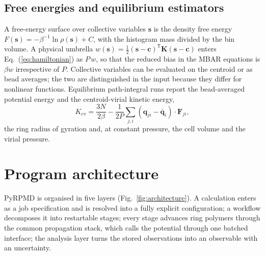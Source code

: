 \documentclass[preprint,12pt]{elsarticle}
\begin{document}
\subsection{Free energies and equilibrium estimators}

A free-energy surface over collective variables $\mathbf s$ is the density free energy $F(\mathbf s)=-\beta^{-1}\ln\rho(\mathbf s)+C$, with the histogram mass divided by the bin volume. A physical umbrella $w(\mathbf s)=\frac12(\mathbf s-\mathbf c)^{\mathsf T}\mathbf K(\mathbf s-\mathbf c)$ enters Eq.~(\ref{eq:hamiltonian}) as $P\,w$, so that the reduced bias in the MBAR equations \cite{samp-mbar2008} is $\beta w$ irrespective of $P$. Collective variables can be evaluated on the centroid or as bead averages; the two are distinguished in the input because they differ for nonlinear functions. Equilibrium path-integral runs report the bead-averaged potential energy and the centroid-virial kinetic energy,
\begin{equation}
K_{\mathrm{cv}}=\frac{3N}{2\beta}-\frac{1}{2P}\sum_{j,i}(\mathbf q_{ji}-\bar{\mathbf q}_i)\cdot\mathbf F_{ji},
\label{eq:kcv}
\end{equation}
the ring radius of gyration and, at constant pressure, the cell volume and the virial pressure.

\section{Program architecture}
\label{sec:architecture}

PyRPMD is organised in five layers (Fig.~\ref{fig:architecture}). A calculation enters as a job specification and is resolved into a fully explicit configuration; a workflow decomposes it into restartable stages; every stage advances ring polymers through the common propagation stack, which calls the potential through one batched interface; the analysis layer turns the stored observations into an observable with an uncertainty.
\end{document}
